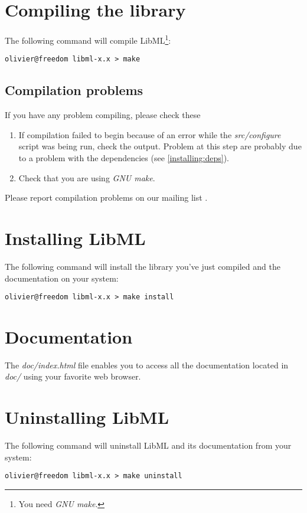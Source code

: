 \section{Compiling the library}
\label{installing:compilation}
The following command will compile LibML\footnote{You need
\textit{GNU make}.}:
\begin{verbatim}
olivier@freedom libml-x.x > make
\end{verbatim}
\subsection*{Compilation problems}
If you have any problem compiling, please check these
\begin{enumerate}
\item If compilation failed to begin because of an error while the
\textit{src/configure} script was being run, check the output. Problem
at this step are probably due to a problem with the dependencies (see \vref{installing:deps}).
\item Check that you are using \textit{GNU make}.
\end{enumerate}
Please report compilation problems on our mailing list \cite{libml:mailinglist}.

\section{Installing LibML}
The following command will install the library you've just compiled and
the documentation on your system:
\begin{verbatim}
olivier@freedom libml-x.x > make install
\end{verbatim}

\section{Documentation}
\label{installing:documentation}
The \textit{doc/index.html} file enables you to access all the documentation
located in \textit{doc/} using your favorite web browser.
\section{Uninstalling LibML}
The following command will uninstall LibML and its documentation from
your system:
\begin{verbatim}
olivier@freedom libml-x.x > make uninstall
\end{verbatim}
